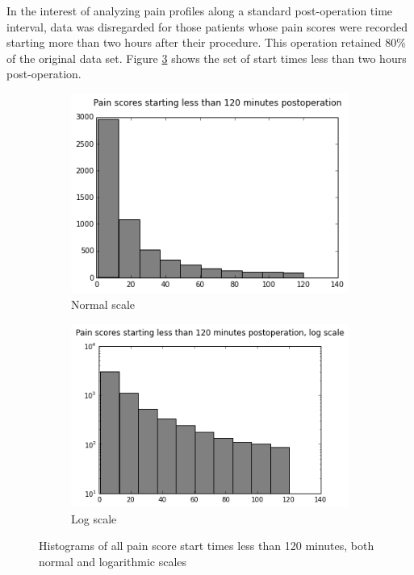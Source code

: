 In the interest of analyzing pain profiles along a standard post-operation time interval, data was disregarded for those patients whose pain scores were recorded starting more than two hours after their procedure. This operation retained 80\% of the original data set. Figure \ref{fig:start_times_pruned} shows the set of start times less than two hours post-operation.

\begin{figure}[h]
        \begin{subfigure}{0.5\textwidth}
                \includegraphics[width=\textwidth]{Figures/pain_score_start_times_lte2hours.png}
                \caption{Normal scale}
                \label{fig:start_times_pruned_normal}
        \end{subfigure}\begin{subfigure}{0.5\textwidth}
                \includegraphics[width=\textwidth]{Figures/pain_score_start_times_lte2hours_log.png}
                \caption{Log scale}
                \label{fig:start_times_pruned_log}
        \end{subfigure}
        \caption{Histograms of all pain score start times less than 120 minutes, both normal and logarithmic scales}\label{fig:start_times_pruned}
\end{figure} 